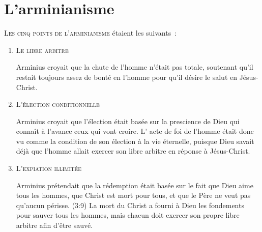 \chapter{L'arminianisme}

\lettrine{L}{es \og cinq points de l'arminianisme \fg{}}\linebreak
 étaient les suivants~:

\begin{enumerate}
  \item  \textsc{Le libre arbitre}

\nobreak
\begin{pocketpar}{}
\begin{digestpar}{}
Arminius croyait que la chute de \pocketlinebreak
 l'homme
  n'était pas totale,
 soute\-nant qu'il restait toujours assez de bonté en l'homme
 pour qu'il désire le salut en Jésus-Christ.
\end{digestpar}
\end{pocketpar}

  \item  \textsc{L'élection conditionnelle}

\nobreak
Arminius croyait que l'élection\pocketlinebreak
 était basée sur la prescience
 de\pocketlinebreak
 Dieu qui connaît à l'avance ceux qui vont croire.
 L' \og acte de foi \fg{} de l'homme était donc vu comme la \og condition \fg{} 
 de son élection à la vie éternelle, puisque Dieu savait déjà
 que l'homme allait exercer son \og libre arbitre \fg{}
 en réponse à Jésus-Christ.

  \item  \textsc{L'expiation illimitée}

\nobreak
Arminius prétendait que la rédemption était basée sur le fait
 que Dieu aime tous les hommes, que Christ est mort pour tous,
 et que le Père ne veut pas qu'aucun périsse.
 (3:9)
 La mort du Christ a fourni à Dieu les fondements
 pour sauver tous les
 hommes, mais chacun doit exercer son propre
 \og libre arbitre \fg{} afin
 d'être sauvé.


\end{enumerate}
